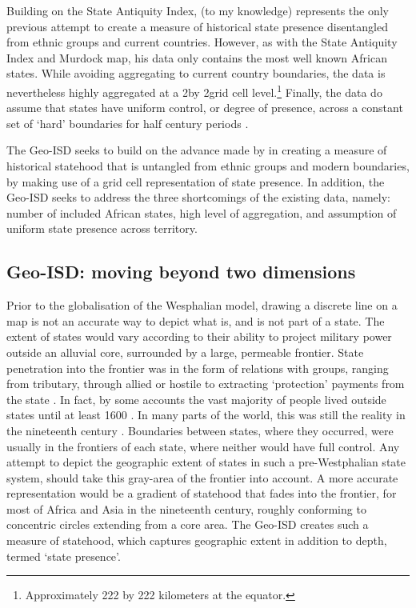 Building on the State Antiquity Index, \citet{Depetris-Chauvin2016} (to my
knowledge) represents the only previous attempt to create a measure of
historical state presence disentangled from ethnic groups and current countries.
However, as with the State Antiquity Index and Murdock map, his data only
contains the most well known African states. While avoiding aggregating to
current country boundaries, the data is nevertheless highly aggregated at a
2\degree  by 2\degree  grid cell level.\footnote{Approximately 222 by 222
kilometers at the equator.} Finally, the data do assume that states have uniform
control, or degree of presence, across a constant set of `hard' boundaries for
half century periods \citep{Depetris-Chauvin2016}. 

The Geo-ISD seeks to build on the advance made by  \citet{Depetris-Chauvin2016}
in creating a measure of historical statehood that is untangled from ethnic
groups and modern boundaries, by making use of a grid cell representation of
state presence. In addition, the Geo-ISD seeks to address the three shortcomings
of the existing data, namely: number of included African states, high level of
aggregation, and assumption of uniform state presence across territory.

\subsection{Geo-ISD: moving beyond two dimensions} 
\label{Geo-ISD}

Prior to the globalisation of the Wesphalian model, drawing a discrete line on a
map is not an accurate way to depict what is, and is not part of a state. The
extent of states would vary according to their ability to project military
power outside an alluvial core, surrounded by a large, permeable frontier. State
penetration into the frontier was in the form of relations with groups, ranging
from tributary, through allied or hostile to extracting `protection' payments
from the state \citep{Scott2009}. In fact, by some accounts the vast majority of
people lived outside states until at least 1600 \citep{scott2017against,
Scott2009}. In many parts of the world, this was still the reality in the
nineteenth century \citep{Scott2009}. Boundaries between states, where they
occurred, were usually in the frontiers of each state, where neither would have
full control. Any attempt to depict the geographic extent of states in such a
pre-Westphalian state system, should take this gray-area of the frontier into
account. A more accurate representation would be a gradient of statehood that
fades into the frontier, for most of Africa and Asia in the nineteenth century,
roughly conforming to concentric circles extending from a core area. The Geo-ISD
creates such a measure of statehood, which captures geographic extent in
addition to depth, termed `state presence'.

